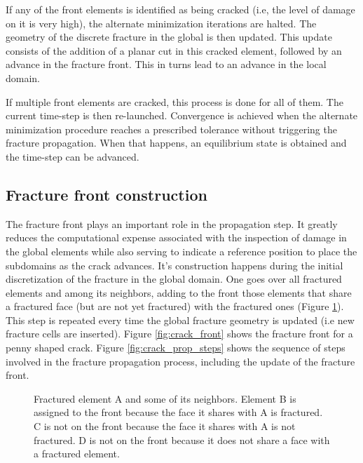 If any of the front elements is identified as being cracked (i.e, the level of damage on it is very high), the alternate minimization iterations are halted. The geometry of the discrete fracture in the global is then updated. This update consists of the addition of a planar cut in this cracked element, followed by an advance in the fracture front. This in turns lead to an advance in the local domain.

If multiple front elements are cracked, this process is done for all of them. The current time-step is then re-launched. Convergence is achieved when the alternate minimization procedure reaches a prescribed tolerance without triggering the fracture propagation. When that happens, an equilibrium state is obtained and the time-step can be advanced.

\subsection{Fracture front construction}\label{sec:front}

The fracture front plays an important role in the propagation step. It greatly reduces the computational expense associated with the inspection of damage in the global elements while also serving to indicate a reference position to place the subdomains as the crack advances. It's construction happens during the initial discretization of the fracture in the global domain. One goes over all fractured elements and among its neighbors, adding to the front those elements that share a fractured face (but are not yet fractured) with the fractured ones (Figure \ref{fig:front_faces}). This step is repeated every time the global fracture geometry is updated (i.e new fracture cells are inserted). Figure \ref{fig:crack_front} shows the fracture front for a penny shaped crack. Figure \ref{fig:crack_prop_steps} shows the sequence of steps involved in the fracture propagation process, including the update of the fracture front.

\begin{figure}[h]
  \centering
  \caption{Fractured element A and some of its neighbors. Element B is assigned to the front because the face it shares with A is fractured. C is not on the front because the face it shares with A is not fractured. D is not on the front because it does not share a face with a fractured element. }
  \label{fig:front_faces}
\end{figure}

